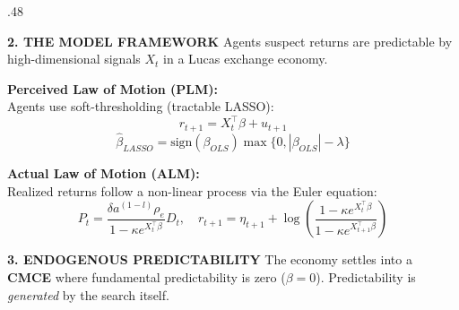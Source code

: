 \documentclass[final]{beamer}
\begin{document}
\begin{frame}[t, plain]
\begin{columns}[t]
\begin{column}{.48\textwidth}
\begin{center}
                \vspace{1cm}

                \begin{tcolorbox}[basebox]
                    {\color{blue900}\Large\textbf{2. THE MODEL FRAMEWORK}} \vspace{0.5cm}
                    Agents suspect returns are predictable by high-dimensional signals $X_t$ in a Lucas exchange economy.
                    
                    \vspace{0.3cm}
                    {\color{blue800}\textbf{Perceived Law of Motion (PLM):}} \\
                    Agents use soft-thresholding (tractable LASSO):
                    \begin{equation*}
                        r_{t+1} = X_t^\top \beta + u_{t+1}
                    \end{equation*}
                    \begin{equation*}
                        \hat{\beta}_{LASSO} = \text{sign}(\beta_{OLS}) \max\{0, |\beta_{OLS}| - \lambda\}
                    \end{equation*}

                    \vspace{0.3cm}
                    {\color{blue800}\textbf{Actual Law of Motion (ALM):}} \\
                    Realized returns follow a non-linear process via the Euler equation:
                    \begin{equation*}
                         P_t = \frac{\delta a^{(1-l)}\rho_e}{1 - \kappa e^{X_t^\top \beta}} D_t, \quad r_{t+1} = \eta_{t+1} + \log\left(\frac{1 - \kappa e^{X_t^\top \beta}}{1 - \kappa e^{X_{t+1}^\top \beta}}\right)
                    \end{equation*}
                \end{tcolorbox}

                \vspace{1cm}

                \begin{tcolorbox}[basebox]
                    {\color{blue900}\Large\textbf{3. ENDOGENOUS PREDICTABILITY}} \vspace{0.5cm}
                    The economy settles into a \textbf{CMCE} where fundamental predictability is zero ($\beta = 0$). Predictability is \textit{generated} by the search itself.
                    

\end{tcolorbox}
\end{center}
\end{column}
\end{columns}
\end{frame}
\end{document}
